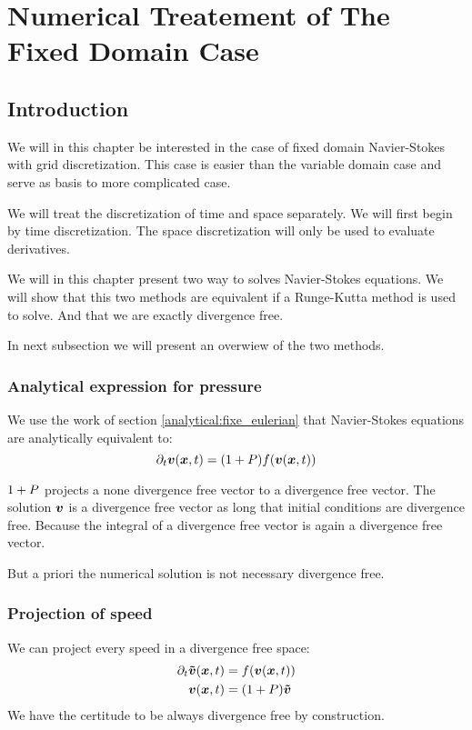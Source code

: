 \chapter{Numerical Treatement of The Fixed Domain Case}
\minitoc

\section{Introduction}

We will in this chapter be interested in the case of fixed domain Navier-Stokes with grid discretization.
This case is easier than the variable domain case and serve as basis to more complicated case.

We will treat the discretization of time and space separately.
We will first begin by time discretization.
The space discretization will only be used to evaluate derivatives.

We will in this chapter present two way to solves Navier-Stokes equations.
We will show that this two methods are equivalent if a Runge-Kutta method is used to solve.
And that we are exactly divergence free.

In next subsection we will present an overwiew of the two methods.

\subsection{Analytical expression for pressure}
\label{fixed:analytical}

We use the work of section \ref{analytical:fixe_eulerian} that Navier-Stokes equations are analytically equivalent to:
\begin{equation}
  \partial_t {\boldsymbol {v}}({\boldsymbol {x}} ,t)=(1+P)f({\boldsymbol {v}}({\boldsymbol {x}},t))
\end{equation}

$1+P$ projects a none divergence free vector to a divergence free vector.
The solution ${\boldsymbol {v}}$ is a divergence free vector as long that initial conditions are divergence free. Because the integral of a divergence free vector is again a divergence free vector.

But a priori the numerical solution is not necessary divergence free.

\subsection{Projection of speed}
\label{fixed:proj}

We can project every speed in a divergence free space:
\begin{subequations}
\begin{align}
  \partial_t {\boldsymbol {\tilde{v}}}({\boldsymbol {x}} ,t)&=f({\boldsymbol {v}}({\boldsymbol {x}},t))\\
  {\boldsymbol {v}}({\boldsymbol {x}},t)&=(1+P){\boldsymbol {\tilde{v}}}
\end{align}
\end{subequations}
We have the certitude to be always divergence free by construction.

